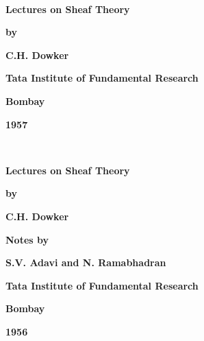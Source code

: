 ~
\thispagestyle{empty}
\begin{center}
{\Large\bf Lectures on Sheaf Theory}
\vskip 1cm

{\bf by}
\medskip

{\large\bf C.H. Dowker}
\vfill

{\bf Tata Institute of Fundamental Research}

{\bf Bombay}

{\bf 1957}
\end{center}

\eject

~
\thispagestyle{empty}
\begin{center}
{\Large\bf Lectures on Sheaf Theory}
\vskip 1cm

{\bf by}
\medskip

{\large\bf C.H. Dowker}
\vfill

{\bf Notes by}
\medskip

{\large\bf S.V. Adavi and N. Ramabhadran}
\vfill

{\bf Tata Institute of Fundamental Research}

{\bf Bombay}

{\bf 1956}
\end{center}


